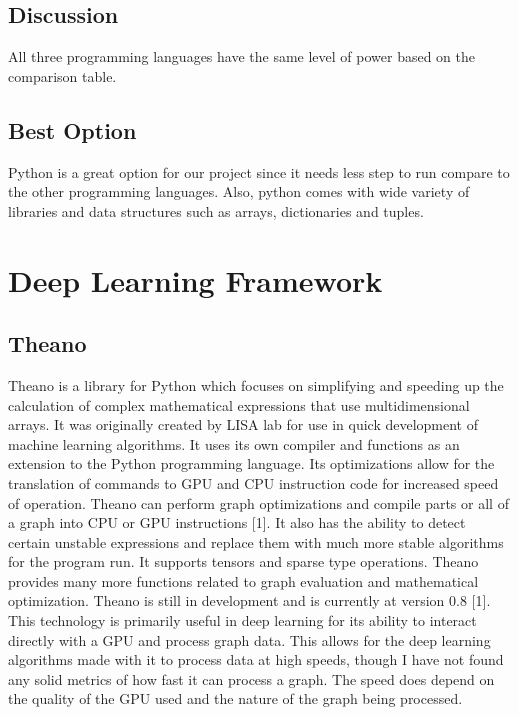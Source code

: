 \documentclass{scrreprt}
\begin{document}
\subsection{Discussion}
All three programming languages have the same level of power based on the comparison table.

\subsection{Best Option}
Python is a great option for our project since it needs less step to run compare to the other
programming languages. Also, python comes with wide variety of libraries and data structures such as
arrays, dictionaries and tuples.


\section{Deep Learning Framework}

\subsection{Theano}
Theano is a library for Python which focuses on simplifying and speeding up the calculation of
complex mathematical expressions that use multidimensional arrays. It was originally created by
LISA lab for use in quick development of machine learning algorithms. It uses its own compiler
and functions as an extension to the Python programming language. Its optimizations allow for
the translation of commands to GPU and CPU instruction code for increased speed of operation.
Theano can perform graph optimizations and compile parts or all of a graph into CPU or GPU
instructions [1]. It also has the ability to detect certain unstable expressions and replace them
with much more stable algorithms for the program run. It supports tensors and sparse type
operations. Theano provides many more functions related to graph evaluation and mathematical
optimization. Theano is still in development and is currently at version 0.8 [1]. This technology
is primarily useful in deep learning for its ability to interact directly with a GPU and process
graph data. This allows for the deep learning algorithms made with it to process data at high
speeds, though I have not found any solid metrics of how fast it can process a graph. The speed
does depend on the quality of the GPU used and the nature of the graph being processed.
\end{document}
